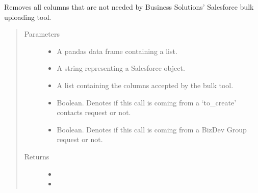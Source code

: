 \documentclass[letterpaper,10pt,english]{sphinxmanual}
\begin{document}
\begin{fulllineitems}
\label{\detokenize{index:ListManagement.utility.general.drop_unneeded_columns}}
Removes all columns that are not needed by Business Solutions’ Salesforce
bulk uploading tool.
\begin{quote}\begin{description}
\item[{Parameters}] \leavevmode\begin{itemize}
\item {} 
 \textendash{} A pandas data frame containing a list.

\item {} 
 \textendash{} A string representing a Salesforce object.

\item {} 
 \textendash{} A list containing the columns accepted by the bulk tool.

\item {} 
 \textendash{} Boolean. Denotes if this call is coming from a ‘to\_create’ contacts
request or not.

\item {} 
 \textendash{} Boolean. Denotes if this call is coming from a BizDev Group request
or not.

\end{itemize}

\item[{Returns}] \leavevmode
\begin{itemize}
\item {} 

\item {} 

\end{itemize}


\end{description}\end{quote}

\end{fulllineitems}
\end{document}
